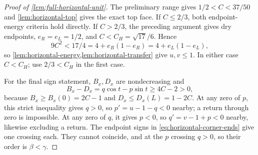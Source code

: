 \begin{proof}[Proof of \cref{lem:full-horizontal-unit}]
The preliminary range gives $1/2<C<37/50$ and
\cref{lem:horizontal-top} gives the exact top face.
If $C\le2/3$, both endpoint-energy criteria hold directly.
If $C>2/3$, the preceding argument gives dry endpoints,
$e_R=e_L=1/2$, and $C<C_H=\sqrt{17}/6$. Hence
\[
 9C^2<17/4=4+e_R(1-e_R)=4+e_L(1-e_L),
\]
so \cref{lem:horizontal-energy,lem:horizontal-transfer} give $u,v\le1$.
In either case $C<C_H$; use $2/3<C_H$ in the first case.

For the final sign statement, $B_x,D_x$ are nondecreasing and
\[
 B_x-D_x=q\cos t-p\sin t\ge4C-2>0,
\]
because $B_x\ge B_x(0)=2C-1$ and
$D_x\le D_x(L)=1-2C$.
At any zero of $p$, this strict inequality gives $q>0$,
so $p'=u-1-q<0$ nearby; a return through zero is impossible.
At any zero of $q$, it gives $p<0$, so $q'=v-1+p<0$
nearby, likewise excluding a return.
The endpoint signs in \eqref{eq:horizontal-corner-ends}
give one crossing each. They cannot coincide, and at the $p$
crossing $q>0$, so their order is $\beta<\gamma$.
\end{proof}
